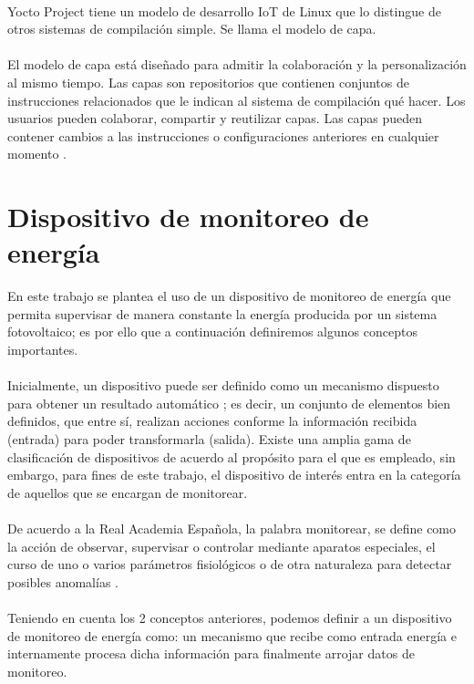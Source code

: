 \paragraph{}
Yocto Project tiene un modelo de desarrollo IoT de Linux que lo distingue de otros sistemas de compilación simple. Se llama el modelo de capa.
\paragraph{}
El modelo de capa está diseñado para admitir la colaboración y la personalización al mismo tiempo. Las capas son repositorios que contienen conjuntos de instrucciones relacionados que le indican al sistema de compilación qué hacer. Los usuarios pueden colaborar, compartir y reutilizar capas. Las capas pueden contener cambios a las instrucciones o configuraciones anteriores en cualquier momento \citep{MarcoTeoricoYocto2}.


\section{Dispositivo de monitoreo de energía}
En este trabajo se plantea el uso de un dispositivo de monitoreo de energía que permita supervisar de manera constante la energía producida por un sistema fotovoltaico; es por ello que a continuación definiremos algunos conceptos importantes.
\paragraph{}
Inicialmente, un dispositivo puede ser definido como un mecanismo dispuesto para obtener un resultado automático \citep{MarcoTeorico11}; es decir, un conjunto de elementos bien definidos, que entre sí, realizan acciones conforme la información recibida (entrada) para poder transformarla (salida).
Existe una amplia gama de clasificación de dispositivos de acuerdo al propósito para el que es empleado, sin embargo, para fines de este trabajo, el dispositivo de interés entra en la categoría de aquellos que se encargan de monitorear. 
\paragraph{}
De acuerdo a la Real Academia Española, la palabra monitorear, se define como la acción de observar, supervisar o controlar mediante aparatos especiales, el curso de uno o varios parámetros fisiológicos o de otra naturaleza para detectar posibles anomalías \citep{MarcoTeorico12}.
\paragraph{}
Teniendo en cuenta los 2 conceptos anteriores, podemos definir a un dispositivo de monitoreo de energía como: un mecanismo que recibe como entrada energía e internamente procesa dicha información para finalmente arrojar datos de monitoreo.
